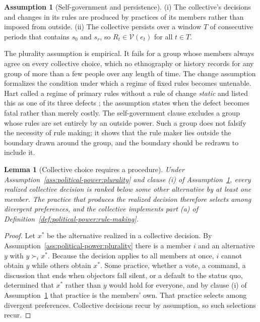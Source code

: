 \documentclass[11pt,letterpaper]{article}
\newtheorem{lemma}[theorem]{Lemma}
\theoremstyle{definition}
\newtheorem{assumption}[theorem]{Assumption}
\theoremstyle{remark}
\begin{document}
\begin{assumption}[Self-government and persistence]
\label{ass:political-power:persistence}
(i) The collective's decisions and changes in its rules are produced by practices of its members rather than imposed from outside. (ii) The collective persists over a window $T$ of consecutive periods that contains $s_0$ and $s_r$, so $R_t\in\mathcal{V}(e_t)$ for all $t\in T$.
\end{assumption}

The plurality assumption is empirical. It fails for a group whose members always agree on every collective choice, which no ethnography or history records for any group of more than a few people over any length of time. The change assumption formalizes the condition under which a regime of fixed rules becomes untenable. Hart called a regime of primary rules without a rule of change \emph{static} and listed this as one of its three defects \citep{hart1961}; the assumption states when the defect becomes fatal rather than merely costly. The self-government clause excludes a group whose rules are set entirely by an outside power. Such a group does not falsify the necessity of rule making; it shows that the rule maker lies outside the boundary drawn around the group, and the boundary should be redrawn to include it.

\begin{lemma}[Collective choice requires a procedure]
\label{lem:political-power:choice}
Under Assumption~\ref{ass:political-power:plurality} and clause (i) of Assumption~\ref{ass:political-power:persistence}, every realized collective decision is ranked below some other alternative by at least one member. The practice that produces the realized decision therefore selects among divergent preferences, and the collective implements part (a) of Definition~\ref{def:political-power:rule-making}.
\end{lemma}

\begin{proof}
Let $x^\ast$ be the alternative realized in a collective decision. By Assumption~\ref{ass:political-power:plurality} there is a member $i$ and an alternative $y$ with $y\succ_i x^\ast$. Because the decision applies to all members at once, $i$ cannot obtain $y$ while others obtain $x^\ast$. Some practice, whether a vote, a command, a discussion that ends when objectors fall silent, or a default to the status quo, determined that $x^\ast$ rather than $y$ would hold for everyone, and by clause (i) of Assumption~\ref{ass:political-power:persistence} that practice is the members' own. That practice selects among divergent preferences. Collective decisions recur by assumption, so such selections recur.
\end{proof}
\end{document}

